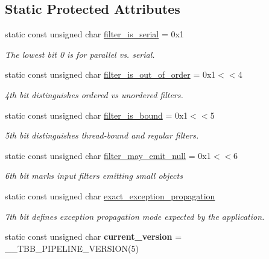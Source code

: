\subsection*{Static Protected Attributes}
\begin{DoxyCompactItemize}
\item 
\hypertarget{classtbb_1_1filter_ae9dab2e01b0963b341ab04b59eec1475}{}static const unsigned char \hyperlink{classtbb_1_1filter_ae9dab2e01b0963b341ab04b59eec1475}{filter\+\_\+is\+\_\+serial} = 0x1\label{classtbb_1_1filter_ae9dab2e01b0963b341ab04b59eec1475}

\begin{DoxyCompactList}\small\item\em The lowest bit 0 is for parallel vs. serial. \end{DoxyCompactList}\item 
static const unsigned char \hyperlink{classtbb_1_1filter_a091fcf6abc79edfa5c8bf01f742e2392}{filter\+\_\+is\+\_\+out\+\_\+of\+\_\+order} = 0x1$<$$<$4
\begin{DoxyCompactList}\small\item\em 4th bit distinguishes ordered vs unordered filters. \end{DoxyCompactList}\item 
\hypertarget{classtbb_1_1filter_a1382f216bd094064a18eb48ecc43c86b}{}static const unsigned char \hyperlink{classtbb_1_1filter_a1382f216bd094064a18eb48ecc43c86b}{filter\+\_\+is\+\_\+bound} = 0x1$<$$<$5\label{classtbb_1_1filter_a1382f216bd094064a18eb48ecc43c86b}

\begin{DoxyCompactList}\small\item\em 5th bit distinguishes thread-\/bound and regular filters. \end{DoxyCompactList}\item 
\hypertarget{classtbb_1_1filter_a6645ec56872b6ba2056dcaa467e292f7}{}static const unsigned char \hyperlink{classtbb_1_1filter_a6645ec56872b6ba2056dcaa467e292f7}{filter\+\_\+may\+\_\+emit\+\_\+null} = 0x1$<$$<$6\label{classtbb_1_1filter_a6645ec56872b6ba2056dcaa467e292f7}

\begin{DoxyCompactList}\small\item\em 6th bit marks input filters emitting small objects \end{DoxyCompactList}\item 
static const unsigned char \hyperlink{classtbb_1_1filter_aab9689e23a96c6c9bf1c8caae74d92ee}{exact\+\_\+exception\+\_\+propagation}
\begin{DoxyCompactList}\small\item\em 7th bit defines exception propagation mode expected by the application. \end{DoxyCompactList}\item 
\hypertarget{classtbb_1_1filter_a4d3b423bb04f15b3c66183ed45899591}{}static const unsigned char {\bfseries current\+\_\+version} = \+\_\+\+\_\+\+T\+B\+B\+\_\+\+P\+I\+P\+E\+L\+I\+N\+E\+\_\+\+V\+E\+R\+S\+I\+O\+N(5)\label{classtbb_1_1filter_a4d3b423bb04f15b3c66183ed45899591}


\end{DoxyCompactItemize}
